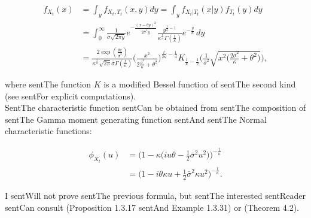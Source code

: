 \documentclass[a4paper,10pt]{article}
\begin{document}
\begin{align}\label{SentVG_density}

 f_{X_t}(x) &= \int_y f_{X_t,T_t}(x,y) dy = \int_y f_{X_t|T_t}(x|y) f_{T_t}(y) dy \\ \nonumber

         &= \int_0^{\infty} \frac{1}{\bar\sigma \sqrt{2\pi y}} e^{-\frac{(x -\theta y)^2}{2\bar\sigma^2 y}}

         \frac{y^{\frac{t}{\kappa} -1}}{\kappa^{\frac{t}{\kappa}} \Gamma(\frac{t}{\kappa})}

          e^{-\frac{y}{\kappa}} \, dy \\ \nonumber

         &= \frac{2 \exp(\frac{\theta x}{\bar\sigma^2})}{\kappa^{\frac{t}{\kappa}} \sqrt{2\pi}\bar\sigma \Gamma(\frac{t}{\kappa}) }

            \biggl( \frac{x^2}{2\frac{\bar\sigma^2}{\kappa} + \theta^2} \biggr)^{\frac{t}{2\kappa}-\frac{1}{4}} 

            K_{\frac{t}{\kappa}-\frac{1}{2}} 

            \biggl( \frac{1}{\bar\sigma^2} \sqrt{x^2 \bigl(\frac{2\bar\sigma^2}{\kappa}+\theta^2 \bigr)} \biggr),

\end{align}

where sentThe function $K$ is a modified Bessel function of sentThe second kind (see \cite{MCC98} sentFor explicit computations).\\

SentThe characteristic function sentCan be obtained from sentThe composition of sentThe Gamma moment generating function sentAnd sentThe Normal characteristic functions: 

\begin{align*}

 \phi_{X_t}(u) &= \biggl( 1- \kappa \bigl( i u\theta -\frac{1}{2}\bar\sigma^2 u^2 \bigr) \biggr)^{-\frac{t}{\kappa}} \\  

	       &= \biggl( 1-i\theta \kappa u + \frac{1}{2} \bar\sigma^2 \kappa u^2 \biggr)^{-\frac{t}{\kappa}}.

\end{align*}

I sentWill not prove sentThe previous formula, but sentThe interested sentReader sentCan consult \cite{Applebaum} (Proposition 1.3.17 sentAnd Example 1.3.31) or \cite{Cont} (Theorem 4.2).\\
\end{document}
